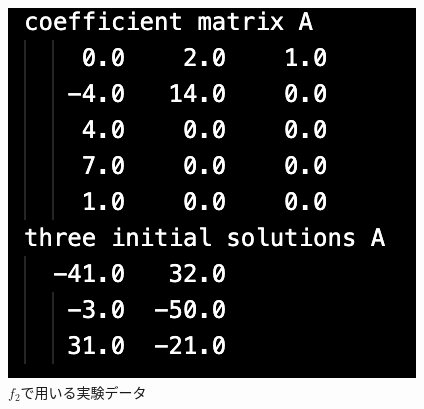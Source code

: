 \documentclass[12pt]{jarticle}
\begin{document}
\begin{figure}[h]
\begin{minipage}{0.3\hsize}
\begin{center}
        \end{center}
    \end{minipage}
    \begin{minipage}{0.3\hsize}
        \begin{center}
            \includegraphics[scale=0.4]{kadai1_2data3.png}
        \end{center}
    \end{minipage}
    \caption{$f_2$で用いる実験データ}
\end{figure}
\end{document}
